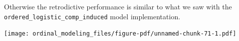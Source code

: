\documentclass[
  letterpaper,
  DIV=11,
  numbers=noendperiod]{scrartcl}
\newenvironment{Shaded}{\begin{snugshade}}{\end{snugshade}}
\newcommand{\AttributeTok}[1]{\textcolor[rgb]{0.40,0.45,0.13}{#1}}
\newcommand{\DecValTok}[1]{\textcolor[rgb]{0.68,0.00,0.00}{#1}}
\newcommand{\FloatTok}[1]{\textcolor[rgb]{0.68,0.00,0.00}{#1}}
\newcommand{\FunctionTok}[1]{\textcolor[rgb]{0.28,0.35,0.67}{#1}}
\newcommand{\NormalTok}[1]{\textcolor[rgb]{0.00,0.23,0.31}{#1}}
\newcommand{\SpecialCharTok}[1]{\textcolor[rgb]{0.37,0.37,0.37}{#1}}
\newcommand{\StringTok}[1]{\textcolor[rgb]{0.13,0.47,0.30}{#1}}
\begin{document}
Otherwise the retrodictive performance is similar to what we saw with
the \texttt{ordered\_logistic\_comp\_induced} model implementation.

\begin{Shaded}
\end{Shaded}

\texttt{[image: ordinal\_modeling\_files/figure-pdf/unnamed-chunk-71-1.pdf]}
\end{document}
